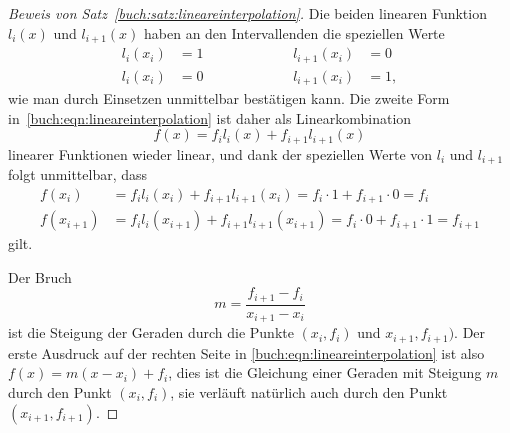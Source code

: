 \begin{proof}[Beweis von Satz~\ref{buch:satz:lineareinterpolation}]
Die beiden linearen Funktion $l_i(x)$ und $l_{i+1}(x)$ haben an den 
Intervallenden die speziellen Werte
\[
\begin{aligned}
l_i(x_i)&=1  &\qquad&\qquad& l_{i+1}(x_i)&=0 \\
l_i(x_i)&=0  &\qquad&\qquad& l_{i+1}(x_i)&=1,
\end{aligned}
\]
wie man durch Einsetzen unmittelbar bestätigen kann.
Die zweite Form in~\eqref{buch:eqn:lineareinterpolation}
ist daher als Linearkombination
\[
f(x)=f_il_i(x) + f_{i+1}l_{i+1}(x)
\]
linearer Funktionen wieder
linear, und dank der speziellen Werte von $l_i$ und $l_{i+1}$ folgt
unmittelbar, dass
\begin{align*}
f(x_i)&=f_il_i(x_i) + f_{i+1}l_{i+1}(x_i) = f_i\cdot 1 + f_{i+1}\cdot 0= f_i\\
f(x_{i+1})&=f_il_i(x_{i+1}) + f_{i+1}l_{i+1}(x_{i+1})= f_i\cdot 0 + f_{i+1}\cdot 1=f_{i+1}
\end{align*}
gilt.

Der Bruch
%
\[
m = \frac{f_{i+1}-f_i}{x_{i+1}-x_i}
\]
ist die Steigung der Geraden durch die Punkte $(x_i,f_i)$ und
$x_{i+1},f_{i+1})$.
%
Der erste Ausdruck auf der rechten Seite in
\eqref{buch:eqn:lineareinterpolation} ist
also $f(x)=m(x-x_i)+f_i$, dies ist die Gleichung einer Geraden
mit Steigung $m$ durch den Punkt $(x_i,f_i)$, sie verläuft natürlich
auch durch den Punkt $(x_{i+1},f_{i+1})$.
%
\end{proof}


